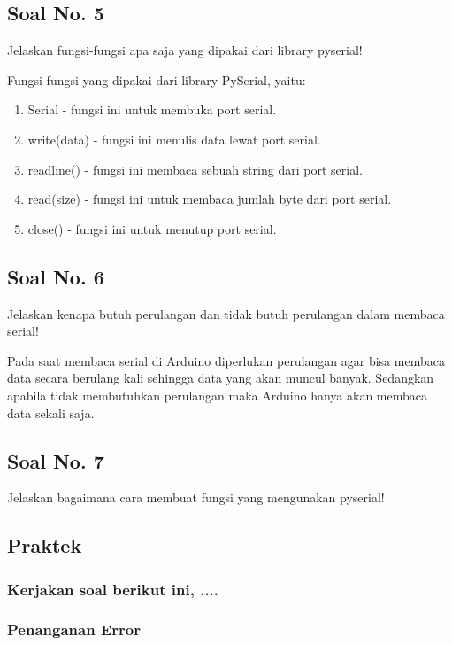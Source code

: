\subsection{Soal No. 5}
Jelaskan fungsi-fungsi apa saja yang dipakai dari library pyserial!

Fungsi-fungsi yang dipakai dari library PySerial, yaitu:
\begin{enumerate}
	\item Serial - fungsi ini untuk membuka port serial.
	\item write(data) - fungsi ini menulis data lewat port serial.
	\item readline() - fungsi ini membaca sebuah string dari port serial.
	\item read(size) - fungsi ini untuk membaca jumlah byte dari port serial.
	\item close() - fungsi ini untuk menutup port serial.
\end{enumerate}

\subsection{Soal No. 6}
Jelaskan kenapa butuh perulangan dan tidak butuh perulangan dalam membaca serial!

Pada saat membaca serial di Arduino diperlukan perulangan agar bisa membaca data secara berulang kali sehingga data yang akan muncul banyak. Sedangkan apabila tidak membutuhkan perulangan maka Arduino hanya akan membaca data sekali saja.

\subsection{Soal No. 7}
Jelaskan bagaimana cara membuat fungsi yang mengunakan pyserial!


\subsection{Praktek}
\subsubsection{Kerjakan soal berikut ini, ....}
\subsubsection{Penanganan Error} 